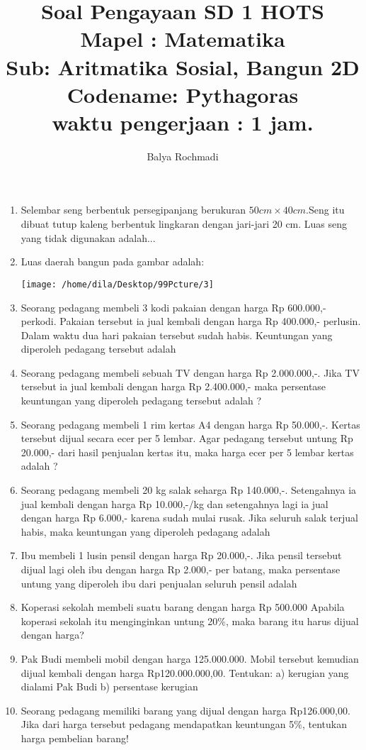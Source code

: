 \documentclass[12pt,a4paper,draft,final,oneside,twoside,openright,openany]{article}
\author{Balya Rochmadi}
\title{Soal Pengayaan SD 1 HOTS\\ Mapel : Matematika\\ Sub: Aritmatika Sosial, Bangun 2D \\Codename: Pythagoras\\ \small waktu pengerjaan : 1 jam.}
\begin{document}
	\maketitle
	\Large
	\begin{enumerate}
	\item Selembar seng berbentuk persegipanjang berukuran $50cm \times 40 cm$.Seng itu dibuat tutup kaleng berbentuk lingkaran dengan jari-jari 20 cm. Luas seng yang tidak digunakan adalah...
	\item Luas daerah bangun pada gambar adalah:
			\begin{center}
				\texttt{[image: /home/dila/Desktop/99Pcture/3]}
			\end{center}
	\item Seorang pedagang membeli 3 kodi pakaian dengan harga Rp 600.000,- perkodi. Pakaian tersebut ia jual kembali dengan harga Rp 400.000,- perlusin. Dalam waktu dua hari pakaian tersebut sudah habis. Keuntungan yang diperoleh pedagang tersebut adalah
	\item Seorang pedagang membeli sebuah TV dengan harga Rp 2.000.000,-. Jika TV tersebut ia jual kembali dengan harga Rp 2.400.000,- maka persentase keuntungan yang diperoleh pedagang tersebut adalah ?
	\item  Seorang pedagang membeli 1 rim kertas A4 dengan harga Rp 50.000,-. Kertas tersebut dijual secara ecer per 5 lembar. Agar pedagang tersebut untung Rp 20.000,- dari hasil penjualan kertas itu, maka harga ecer per 5 lembar kertas adalah ?
	\item Seorang pedagang membeli 20 kg salak seharga Rp 140.000,-. Setengahnya ia jual kembali dengan harga Rp 10.000,-/kg dan setengahnya lagi ia jual dengan harga Rp 6.000,- karena sudah mulai rusak. Jika seluruh salak terjual habis, maka keuntungan yang diperoleh pedagang adalah 
	\item Ibu membeli 1 lusin pensil dengan harga Rp 20.000,-. Jika pensil tersebut dijual lagi oleh ibu dengan harga Rp 2.000,- per batang, maka persentase untung yang diperoleh ibu dari penjualan seluruh pensil adalah 
	\item Koperasi sekolah membeli suatu barang dengan harga 
	 Rp 500.000 Apabila koperasi sekolah itu menginginkan untung 20$\%$, maka barang itu harus dijual dengan harga?
	\item Pak Budi membeli mobil dengan harga 125.000.000. Mobil tersebut kemudian dijual kembali dengan harga Rp120.000.000,00. Tentukan:
	a) kerugian yang dialami Pak Budi
	b) persentase kerugian
	\item Seorang pedagang memiliki barang yang dijual dengan harga Rp126.000,00. Jika dari harga tersebut pedagang mendapatkan keuntungan 5$\%$, tentukan harga pembelian barang! 
	\end{enumerate}
		
\end{document}
